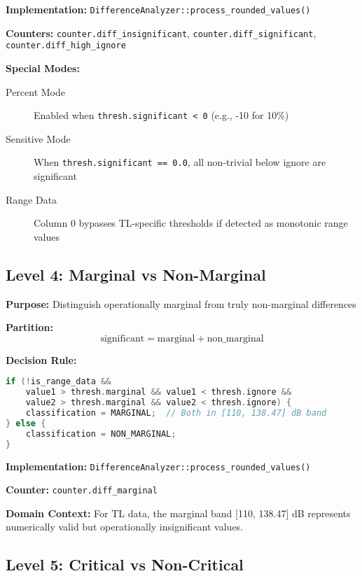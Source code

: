 \textbf{Implementation:} \texttt{DifferenceAnalyzer::process\_rounded\_values()}

\textbf{Counters:} \texttt{counter.diff\_insignificant}, \texttt{counter.diff\_significant}, \texttt{counter.diff\_high\_ignore}

\textbf{Special Modes:}
\begin{description}
    \item[Percent Mode] Enabled when \texttt{thresh.significant < 0} (e.g., -10 for 10\%)
    \item[Sensitive Mode] When \texttt{thresh.significant == 0.0}, all non-trivial below ignore are significant
    \item[Range Data] Column 0 bypasses TL-specific thresholds if detected as monotonic range values
\end{description}

\subsection{Level 4: Marginal vs Non-Marginal}

\textbf{Purpose:} Distinguish operationally marginal from truly non-marginal differences

\textbf{Partition:}
\begin{equation}
    \text{significant} = \text{marginal} + \text{non\_marginal}
\end{equation}

\textbf{Decision Rule:}
\begin{lstlisting}[language=C++]
if (!is_range_data &&
    value1 > thresh.marginal && value1 < thresh.ignore &&
    value2 > thresh.marginal && value2 < thresh.ignore) {
    classification = MARGINAL;  // Both in [110, 138.47] dB band
} else {
    classification = NON_MARGINAL;
}
\end{lstlisting}

\textbf{Implementation:} \texttt{DifferenceAnalyzer::process\_rounded\_values()}

\textbf{Counter:} \texttt{counter.diff\_marginal}

\textbf{Domain Context:} For TL data, the marginal band [110, 138.47] dB represents numerically valid but operationally insignificant values.

\subsection{Level 5: Critical vs Non-Critical}

